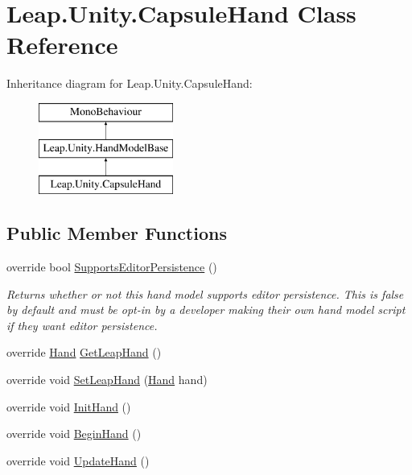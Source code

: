 \hypertarget{class_leap_1_1_unity_1_1_capsule_hand}{}\section{Leap.\+Unity.\+Capsule\+Hand Class Reference}
\label{class_leap_1_1_unity_1_1_capsule_hand}
Inheritance diagram for Leap.\+Unity.\+Capsule\+Hand\+:\begin{figure}[H]
\begin{center}
\leavevmode
\includegraphics[height=3.000000cm]{class_leap_1_1_unity_1_1_capsule_hand}
\end{center}
\end{figure}
\subsection*{Public Member Functions}
\begin{DoxyCompactItemize}
\item 
override bool \mbox{\hyperlink{class_leap_1_1_unity_1_1_capsule_hand_ae914f49384f678f6613cd95f71eae24f}{Supports\+Editor\+Persistence}} ()
\begin{DoxyCompactList}\small\item\em Returns whether or not this hand model supports editor persistence. This is false by default and must be opt-\/in by a developer making their own hand model script if they want editor persistence. \end{DoxyCompactList}\item 
override \mbox{\hyperlink{class_leap_1_1_hand}{Hand}} \mbox{\hyperlink{class_leap_1_1_unity_1_1_capsule_hand_a6e1d6a507332ba5577a1e2b17332039b}{Get\+Leap\+Hand}} ()
\item 
override void \mbox{\hyperlink{class_leap_1_1_unity_1_1_capsule_hand_a36435c4a198b8fcf38560846141c15a5}{Set\+Leap\+Hand}} (\mbox{\hyperlink{class_leap_1_1_hand}{Hand}} hand)
\item 
override void \mbox{\hyperlink{class_leap_1_1_unity_1_1_capsule_hand_a1dc96b8ca5deda73cac12d70b46bc9c5}{Init\+Hand}} ()
\item 
override void \mbox{\hyperlink{class_leap_1_1_unity_1_1_capsule_hand_a7d7dc1487d108b421878276cc3747c52}{Begin\+Hand}} ()
\item 
override void \mbox{\hyperlink{class_leap_1_1_unity_1_1_capsule_hand_a4a90f86a17e589ea462e29d99a2a51f9}{Update\+Hand}} ()
\end{DoxyCompactItemize}
